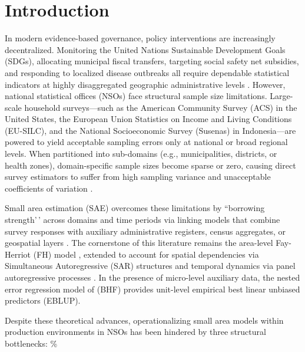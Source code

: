 \section{Introduction} \label{sec:intro}

In modern evidence-based governance, policy interventions are increasingly decentralized. Monitoring the United Nations Sustainable Development Goals (SDGs), allocating municipal fiscal transfers, targeting social safety net subsidies, and responding to localized disease outbreaks all require dependable statistical indicators at highly disaggregated geographic administrative levels \citep{rao2015small, pfeffermann2013new}. However, national statistical offices (NSOs) face structural sample size limitations. Large-scale household surveys---such as the American Community Survey (ACS) in the United States, the European Union Statistics on Income and Living Conditions (EU-SILC), and the National Socioeconomic Survey (Susenas) in Indonesia---are powered to yield acceptable sampling errors only at national or broad regional levels. When partitioned into sub-domains (e.g., municipalities, districts, or health zones), domain-specific sample sizes become sparse or zero, causing direct survey estimators to suffer from high sampling variance and unacceptable coefficients of variation \citep{burgard2020computational, pratesi2016analysis}.

Small area estimation (SAE) overcomes these limitations by ``borrowing strength'\,' across domains and time periods via linking models that combine survey responses with auxiliary administrative registers, census aggregates, or geospatial layers \citep{rao2015small}. The cornerstone of this literature remains the area-level Fay-Herriot (FH) model \citep{fay1979estimates}, extended to account for spatial dependencies via Simultaneous Autoregressive (SAR) structures \citep{petrucci2006small, pratesi2008small} and temporal dynamics via panel autoregressive processes \citep{marhuenda2013small}. In the presence of micro-level auxiliary data, the nested error regression model of \citet{battese1988error} (BHF) provides unit-level empirical best linear unbiased predictors (EBLUP).

Despite these theoretical advances, operationalizing small area models within production environments in NSOs has been hindered by three structural bottlenecks:
\%


